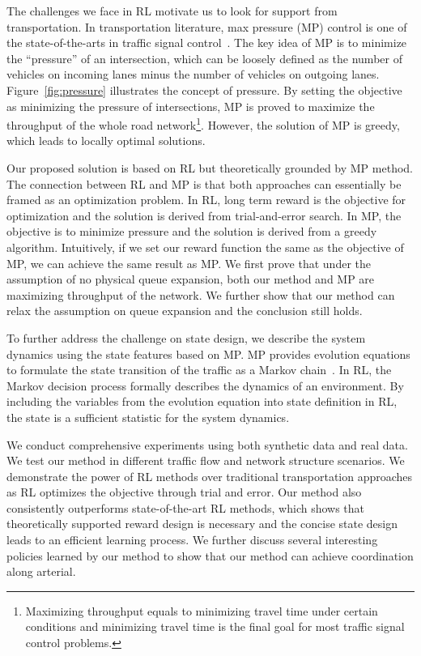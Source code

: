 The challenges we face in RL motivate us to look for support from transportation. In transportation literature, max pressure (MP) control is one of the state-of-the-arts in traffic signal control~\cite{MP13-adaptvie,MP13}. The key idea of MP is to minimize the ``pressure'' of an intersection, which can be loosely defined as the number of vehicles on incoming lanes minus the number of vehicles on outgoing lanes. Figure~\ref{fig:pressure} illustrates the concept of pressure. By setting the objective as minimizing the pressure of intersections, MP is proved to maximize the throughput of the whole road network\footnote{Maximizing throughput equals to minimizing travel time under certain conditions and minimizing travel time is the final goal for most traffic signal control problems.}. However, the solution of MP is greedy, which leads to locally optimal solutions. 

Our proposed solution is based on RL but theoretically grounded by MP method. The connection between RL and MP is that both approaches can essentially be framed as an optimization problem. In RL, long term reward is the objective for optimization and the solution is derived from trial-and-error search. In MP, the objective is to minimize pressure and the solution is derived from a greedy algorithm. Intuitively, if we set our reward function the same as the objective of MP, we can achieve the same result as MP. We first prove that under the assumption of no physical queue expansion, both our method and MP are maximizing throughput of the network. We further show that our method can relax the assumption on queue expansion and the conclusion still holds.

To further address the challenge on state design, we describe the system dynamics using the state features based on MP. MP provides evolution equations to formulate the state transition of the traffic as a Markov chain~\cite{MP13book}. In RL, the Markov decision process formally describes the dynamics of an environment. By including the variables from the evolution equation into state definition in RL, the state is a sufficient statistic for the system dynamics.

We conduct comprehensive experiments using both synthetic data and real data. We test our method in different traffic flow and network structure scenarios. We demonstrate the power of RL methods over traditional transportation approaches as RL optimizes the objective through trial and error. Our method also consistently outperforms state-of-the-art RL methods, which shows that theoretically supported reward design is necessary and the concise state design leads to an efficient learning process. We further discuss several interesting policies learned by our method to show that our method can achieve coordination along arterial.
\vspace{-3mm}

